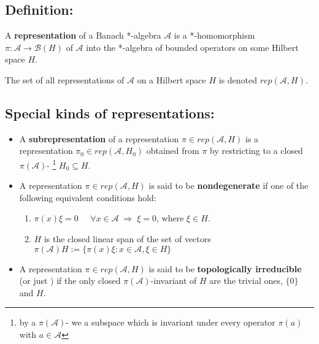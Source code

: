 \documentclass[12pt]{article}
\begin{document}

\subsection*{Definition:}
A {\bf representation} of a Banach *-algebra $\mathcal{A}$ is a *-homomorphism $\pi : \mathcal{A} \longrightarrow \mathcal{B}(H)$ of $\mathcal{A}$ into the *-algebra of bounded operators on some Hilbert space $H$.

The set of all representations of $\mathcal{A}$ on a Hilbert space $H$ is denoted $rep(\mathcal{A},H)$.


\subsection*{Special kinds of representations:}

\begin{itemize}
\item A {\bf subrepresentation} of a representation $\pi \in rep(\mathcal{A},H)$ is a representation $\pi_0 \in rep(\mathcal{A},H_0)$ obtained from $\pi$ by restricting to a closed $\pi(\mathcal{A})$- \footnote{by a $\pi(\mathcal{A})$- we  a subspace which is invariant under every operator $\pi(a)$ with $a \in \mathcal{A}$} $H_0 \subseteq H$.
\end{itemize}

\begin{itemize}
\item A representation $\pi \in rep(\mathcal{A},H)$ is said to be {\bf nondegenerate} if one of the following equivalent conditions hold:
\begin{enumerate}
\item $\pi(x)\xi = 0 \;\;\;\;\; \forall x\in \mathcal{A}\; \Longrightarrow \; \xi = 0$, where $\xi \in H$.
\item $H$ is the closed linear span of the set of vectors $\pi(\mathcal{A})H := \{\pi(x)\xi : x \in \mathcal{A}, \xi \in H\}$
\end{enumerate}
\end{itemize}

\begin{itemize}
\item A representation $\pi \in rep(\mathcal{A},H)$ is said to be {\bf topologically irreducible} (or just ) if the only closed $\pi(\mathcal{A})$-invariant  of $H$ are the trivial ones, $\{0\}$ and $H$.
\end{itemize}
\end{document}
